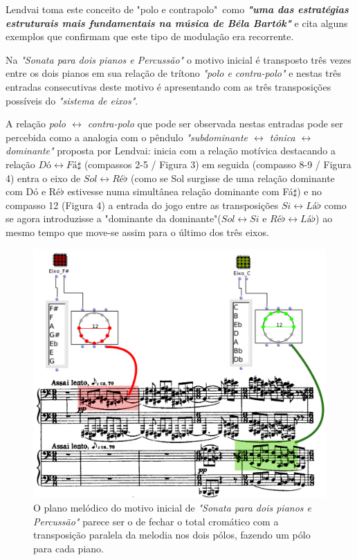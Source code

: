 \documentclass[
	12pt,				%
	openright,			%
	twoside,			%
	a4paper,			%
	english,			%
	french,				%
	spanish,			%
	brazil				%
	]{abntex2}
\begin{document}
Lendvai toma este conceito de "polo e contrapolo"\ como \textit{\textbf{"uma das estratégias estruturais mais fundamentais na música de Béla Bartók"}}\cite[ p.04]{lendvai1971bela} e cita alguns exemplos que confirmam que este tipo de modulação era recorrente.

 
Na \textit{"Sonata para dois pianos e Percussão"} o motivo inicial é transposto três vezes entre os dois pianos em sua relação de trítono \textit{"polo e contra-polo"} e nestas três entradas consecutivas deste motivo é apresentando com as três transposições possíveis do \textit{"sistema de eixos"}.

A relação \textit{polo $\leftrightarrow$ contra-polo} que pode ser observada nestas entradas pode ser percebida como a analogia com o pêndulo \textit{"subdominante $\leftrightarrow$ tônica $\leftrightarrow$ dominante"} proposta por Lendvai: inicia com a relação motívica destacando a relação $Dó \leftrightarrow Fá\sharp$ (compassos 2-5 / Figura 3) em seguida (compasso 8-9 / Figura 4) entra o eixo de $Sol \leftrightarrow Ré\flat$ (como se Sol surgisse de uma relação dominante com Dó e Ré$\flat$ estivesse numa simultânea relação dominante com Fá$\sharp$) e no compasso 12 (Figura 4) a entrada do jogo entre as transposições $Si \leftrightarrow Lá\flat$ como se agora introduzisse a "dominante da dominante"($Sol \leftrightarrow Si$ e $Ré\flat \leftrightarrow Lá\flat$) ao mesmo tempo que move-se assim para o último dos três eixos.

\begin{figure}[!h]
	\caption{\label{fig_grafico}O plano melódico do motivo inicial de \textit{"Sonata para dois pianos e Percussão"}  parece ser o de fechar o total cromático com a transposição paralela da melodia nos dois pólos, fazendo um pólo para cada piano. }
	\begin{center}
	    \includegraphics[scale=0.27]{axis/sonata2pianos_dofasus.png}
	\end{center}
\end{figure}
\end{document}
